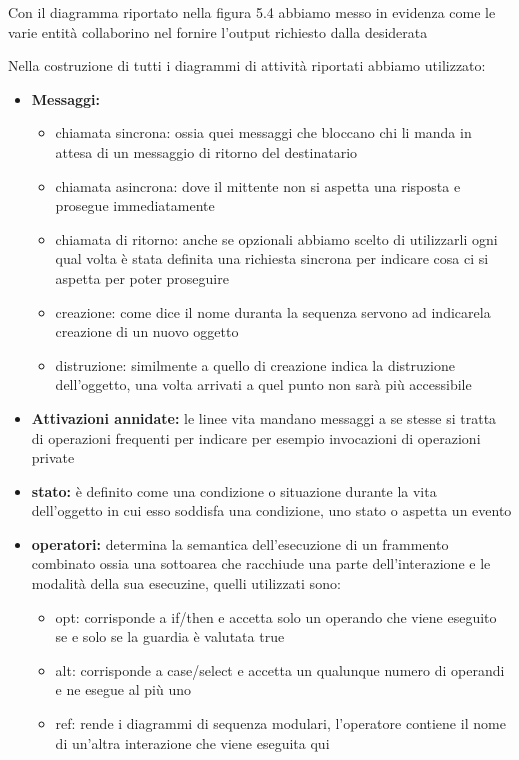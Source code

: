 \documentclass[a4paper, 11pt,oneside]{book}
\newcommand{\spacing}{\par\bigskip\noindent}
\begin{document}
        \spacing
        \newpage\noindent
        Con il diagramma riportato nella figura 5.4 abbiamo messo in evidenza come le varie entità collaborino nel fornire l'output richiesto dalla desiderata
        \spacing
        Nella costruzione di tutti i diagrammi di attività riportati abbiamo utilizzato:
        \begin{itemize}
            \item \textbf{Messaggi:}
            \begin{itemize}
                \item chiamata sincrona: ossia quei messaggi che bloccano chi li manda in attesa di un messaggio di ritorno del destinatario
                \item chiamata asincrona: dove il mittente non si aspetta una risposta e prosegue immediatamente
                \item chiamata di ritorno: anche se opzionali abbiamo scelto di utilizzarli ogni qual volta è stata definita una richiesta sincrona per indicare
                cosa ci si aspetta per poter proseguire
                \item creazione: come dice il nome duranta la sequenza servono ad indicarela creazione di un nuovo oggetto
                \item distruzione: similmente a quello di creazione indica la distruzione dell'oggetto, una volta arrivati a quel punto non sarà più accessibile
            \end{itemize}
            \item \textbf{Attivazioni annidate:} le linee vita mandano messaggi a se stesse si tratta di operazioni frequenti per indicare per esempio invocazioni di operazioni private
            \item \textbf{stato:} è definito come una condizione o situazione durante la vita dell'oggetto in cui esso soddisfa una condizione, uno stato o aspetta un evento
            \item \textbf{operatori:} determina la semantica dell'esecuzione di un frammento combinato ossia una sottoarea che racchiude una parte dell'interazione e le modalità della sua esecuzine, quelli utilizzati sono:
            \begin{itemize}
                \item opt: corrisponde a if/then e accetta solo un operando che viene eseguito se e solo se la guardia è valutata true
                \item alt: corrisponde a case/select e accetta un qualunque numero di operandi e ne esegue al più uno
                \item ref: rende i diagrammi di sequenza modulari, l'operatore contiene il nome di un'altra interazione che viene eseguita qui
            \end{itemize}
        \end{itemize}
\end{document}
